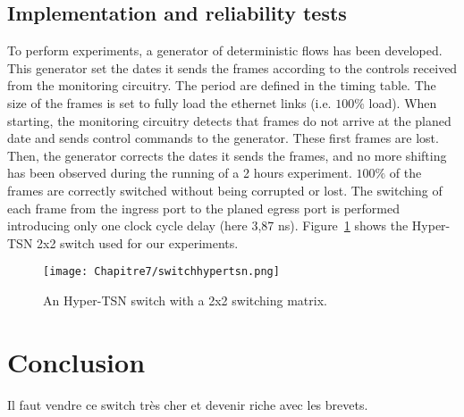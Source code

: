 \subsection{Implementation and reliability tests}

To perform experiments, a generator of deterministic flows has been developed. This generator set the dates it sends the frames according to the controls received from the monitoring circuitry. The period are defined in the timing table. The size of the frames is set to fully load the ethernet links (i.e. $100\%$ load).
When starting, the monitoring circuitry detects that frames do not arrive at the planed date and sends control commands to the generator. These first frames are lost. Then, the generator corrects the dates it sends the frames, and no more shifting has been observed during the running of a 2 hours experiment. $100\%$ of the frames are correctly switched without being corrupted or lost. The switching of each frame from the ingress port to the planed egress port is performed introducing only one clock cycle delay (here 3,87 ns).
Figure~\ref{fig:hypertsnswitch} shows the Hyper-TSN 2x2 switch used for our experiments.
\begin{center}

\begin{figure}[h]
  \centering
\texttt{[image: Chapitre7/switchhypertsn.png]}
\caption{ An Hyper-TSN switch with a 2x2 switching matrix.}
\label{fig:hypertsnswitch}
\end{figure}
\end{center}


\section{Conclusion}


Il faut vendre ce switch très cher et devenir riche avec les brevets.